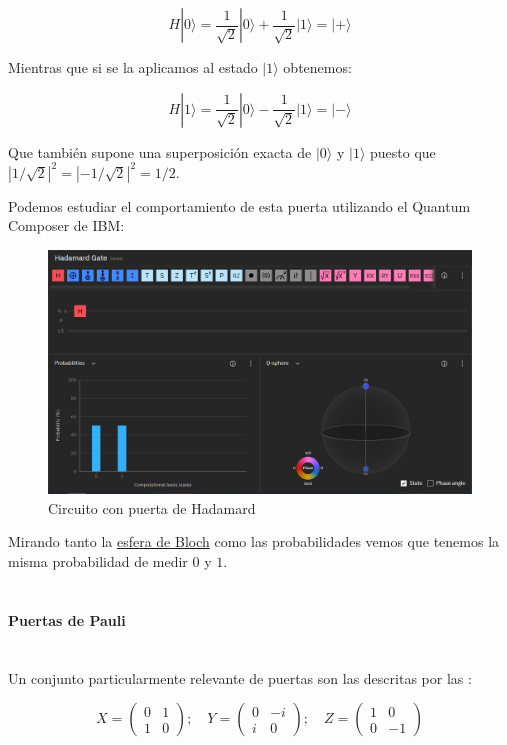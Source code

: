 \documentclass[11pt]{article}
\newcommand{\ra}{\rangle}
\newcommand{\myparagraph}[1]{\paragraph*{ \\ #1}\mbox{}\\}
\theoremstyle{plain}
\begin{document}
\[
	H|0\ra = \frac{1}{\sqrt 2} |0\ra + \frac{1}{\sqrt 2} |1\ra = |+\ra
\]

Mientras que si se la aplicamos al estado $|1\ra$ obtenemos:

\[
	H|1\ra = \frac{1}{\sqrt 2} |0\ra - \frac{1}{\sqrt 2} |1\ra = |-\ra
\]

Que también supone una superposición exacta de $|0\ra$ y $|1\ra$ puesto que $|1/\sqrt 2|^2 = |-1/\sqrt 2|^2 = 1/2$.

Podemos estudiar el comportamiento de esta puerta utilizando el Quantum Composer de IBM:

\begin{figure}[H]
	\centering
	\includegraphics[scale=0.5]{figures/gate-hadamard.png}
	\caption{Circuito con puerta de Hadamard}
\end{figure}

Mirando tanto la \href{URL}{esfera de Bloch} como las probabilidades vemos que tenemos la misma probabilidad de medir $0$ y $1$. \\


\myparagraph{Puertas de Pauli}


Un conjunto particularmente relevante de puertas son las descritas por las :

\[
X =
	\begin{pmatrix}
		0 & 1 \\
		1 & 0 
	\end{pmatrix}; \quad
	Y =
	\begin{pmatrix}
		0 & -i \\
		i & 0 
	\end{pmatrix}; \quad
	Z =
	\begin{pmatrix}
		1 & 0 \\
		0 & -1 
	\end{pmatrix}
\]
\end{document}
